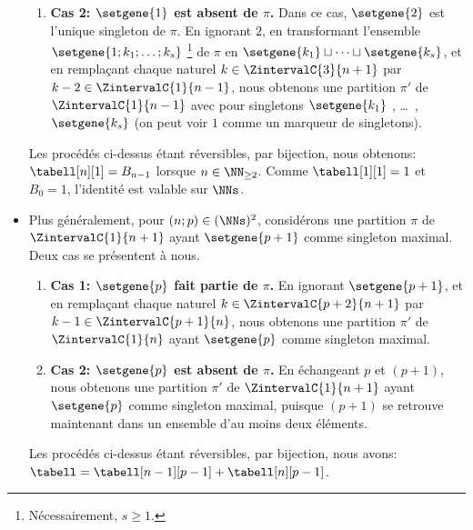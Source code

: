 \begin{itemize}
\begin{enumerate}
        \item \textbf{\boldmath Cas 2: $\setgene{1}$ est absent de $\pi$.}
        Dans ce cas, $\setgene{2}$ est l'unique singleton de $\pi$.
        En ignorant $2$,
        en transformant l'ensemble $\setgene{1 ; k_1 ; \dots ; k_s}$%
        \footnote{
            Nécessairement, $s \geq 1$.
        }
        de $\pi$ en $\setgene{k_1} \sqcup \dots \sqcup \setgene{k_s}$,
        et
        en remplaçant chaque naturel $k \in \ZintervalC{3}{n+1}$ par $k-2 \in \ZintervalC{1}{n-1}$,
        nous obtenons une partition $\pi'$ de $\ZintervalC{1}{n-1}$ avec pour singletons $\setgene{k_1}$ , \dots\ , $\setgene{k_s}$
        (on peut voir $1$ comme un marqueur de singletons).
    \end{enumerate}
    Les procédés ci-dessus étant réversibles, par bijection, nous obtenons:
    $\tabell[n][1] = B_{n-1}$ lorsque $n \in \NN_{\geq2}$.
    Comme $\tabell[1][1] = 1$ et $B_0 = 1$, l'identité est valable sur $\NNs$.


    \item Plus généralement, pour $(n ; p) \in (\NNs)^2$, considérons une partition $\pi$ de $\ZintervalC{1}{n+1}$ ayant $\setgene{p+1}$ comme singleton maximal.
    Deux cas se présentent à nous.
    \begin{enumerate}
        \item \textbf{\boldmath Cas 1: $\setgene{p}$ fait partie de $\pi$.}
        En ignorant $\setgene{p+1}$,
        et
        en remplaçant chaque naturel $k \in \ZintervalC{p+2}{n+1}$ par $k-1 \in \ZintervalC{p+1}{n}$,
        nous obtenons une partition $\pi'$ de $\ZintervalC{1}{n}$ ayant $\setgene{p}$ comme singleton maximal.


        \item \textbf{\boldmath Cas 2: $\setgene{p}$ est absent de $\pi$.}
        En échangeant $p$ et $(p+1)$,
        nous obtenons une partition $\pi'$ de $\ZintervalC{1}{n+1}$ ayant $\setgene{p}$ comme singleton maximal, puisque $(p+1)$ se retrouve maintenant dans un ensemble d'au moins deux éléments.
    \end{enumerate}
    Les procédés ci-dessus étant réversibles, par bijection, nous avons:
    $\tabell = \tabell[n-1][p-1] +  \tabell[n][p-1]$.
\end{itemize}


